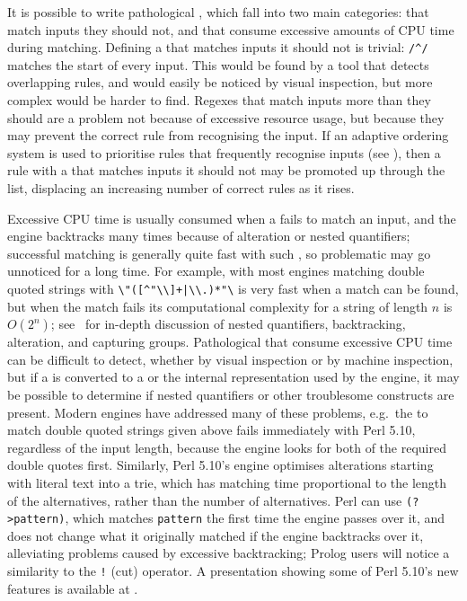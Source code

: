 It is possible to write pathological \regexes{}, which fall into two main
categories: \regexes{} that match inputs they should not, and \regexes{}
that consume excessive amounts of CPU time during matching.  Defining a
 that matches inputs it should not is trivial: \verb!/^/!
matches the start of every input.  This  would be found by a
tool that detects overlapping rules, and would easily be noticed by visual
inspection, but more complex \regexes{} would be harder to find.  Regexes
that match inputs more than they should are a problem not because of
excessive resource usage, but because they may prevent the correct rule
from recognising the input.  If an adaptive ordering system is used to
prioritise rules that frequently recognise inputs (see ), then a rule with a  that matches
inputs it should not may be promoted up through the list, displacing an
increasing number of correct rules as it rises.

Excessive CPU time is usually consumed when a  fails to
match an input, and the  engine backtracks many times
because of alteration or nested quantifiers; successful matching is
generally quite fast with such \regexes{}, so problematic \regexes{} may go
unnoticed for a long time.  For example, with most  engines
matching double quoted strings with \verb!\"([^"\\]+|\\.)*"\!  is very fast
when a match can be found, but when the match fails its computational
complexity for a string of length $n$ is $O(2^{n})$;
see~\cite{mastering-regular-expressions} for in-depth discussion of nested
quantifiers, backtracking, alteration, and capturing groups.  Pathological
\regexes{} that consume excessive CPU time can be difficult to detect,
whether by visual inspection or by machine inspection, but if a
 is converted to a  or the internal
representation used by the  engine, it may be possible to
determine if nested quantifiers or other troublesome constructs are
present.  Modern  engines have addressed many of these
problems, e.g.\ the  to match double quoted strings given
above fails immediately with Perl 5.10, regardless of the input length,
because the  engine looks for both of the required double
quotes first.  Similarly, Perl 5.10's  engine optimises
alterations starting with literal text into a trie, which has matching time
proportional to the length of the alternatives, rather than the number of
alternatives.  Perl \regexes{} can use \verb!(?>pattern)!, which matches
\verb!pattern! the first time the  engine passes over it,
and does not change what it originally matched if the 
engine backtracks over it, alleviating problems caused by excessive
backtracking; Prolog users will notice a similarity to the \verb'!' (cut)
operator.  A presentation showing some of Perl 5.10's new 
features is available at
.

